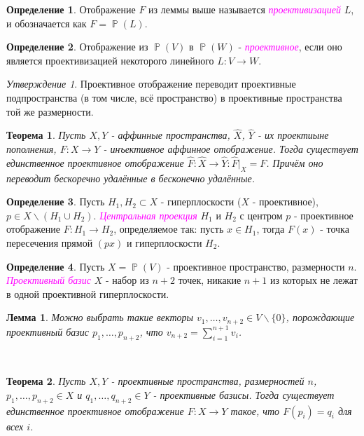 \documentclass[a4paper,100pt]{article}
\theoremstyle{indented}
\newtheorem{theorem}{Теорема}
\newtheorem{lemma}{Лемма}
\theoremstyle{definition}
\newtheorem{defn}{Определение}
\theoremstyle{remark}
\newtheorem{stat}{Утверждение}
\DeclareMathOperator{\ra}{\rightarrow}
\DeclareMathOperator{\PP}{\mathbb{P}}
\begin{document}
\begin{defn}
    Отображение $F$ из леммы выше называется \textit{\textcolor{magenta}{\hypertarget{s42}{проективизацией}}} $L$, и обозначается как $F=\PP(L)$. 
\end{defn}

\begin{defn}
    Отображение из $\PP(V)$ в $\PP(W)$ - \textit{\textcolor{magenta}{\hypertarget{s43}{проективное}}}, если оно является проективизацией некоторого линейного $L:V\ra W$. 
\end{defn}

\begin{stat}
    Проективное отображение переводит проективные подпространства (в том числе, всё пространство) в проективные пространства той же размерности.
\end{stat}

\begin{theorem}
    Пусть $X, Y$ - аффинные пространства, $\hat{X}$, $\hat{Y}$ - их проектиыне пополнения, $F: X\ra Y$ - инъективное аффинное отображение. Тогда существует единственное проективное отображение $\hat{F}: \hat{X} \ra \hat{Y}:\hat{F}|_X = F$. Причём оно переводит бескоречно удалённые в бесконечно удалённые.
\end{theorem}

\begin{defn}
    Пусть $H_1, H_2 \subset X$ - гиперплоскости ($X$ - проективное), $p \in X \backslash (H_1 \cup H_2)$. \textit{\textcolor{magenta}{\hypertarget{s44}{Центральная проекция}}} $H_1$ и $H_2$ с центром $p$ - проективное отображение $F:H_1 \ra H_2$, определяемое так: пусть $x\in H_1$, тогда $F(x)$ - точка пересечения прямой $(px)$ и гиперплоскости $H_2$.
\end{defn}

\begin{defn}
    Пусть $X = \PP(V)$ - проективное пространство, размерности $n$. \textit{\textcolor{magenta}{\hypertarget{s45}{Проективный базис}}} $X$ - набор из $n+2$ точек, никакие $n+1$ из которых не лежат в одной проективной гиперплоскости.
\end{defn}

\begin{lemma}
    Можно выбрать такие векторы $v_1, \ldots, v_{n+2}\in V\backslash \{0\}$, порождающие проективный базис $p_1, \ldots, p_{n+2}$, что $v_{n+2}=\sum_{i=1}^{n+1}v_i$. 
\end{lemma} \

\begin{theorem}
    Пусть $X, Y$ - проективные пространства, размерностей $n$, $p_1, \ldots, p_{n+2}\in X$ и $q_1, \ldots, q_{n+2}\in Y$ - проективные базисы. Тогда существует единственное проективное отображение $F: X\ra Y$ такое, что $F(p_i)=q_i$ для всех $i$. 
\end{theorem}
\end{document}
